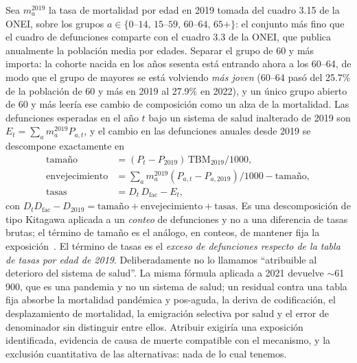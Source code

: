 \documentclass[11pt,a4paper]{article}
\begin{document}
Sea $m^{2019}_a$ la tasa de mortalidad por edad en 2019 tomada del cuadro 3.15 de la ONEI, sobre los grupos $a\in\{0\text{--}14,\,15\text{--}59,\,60\text{--}64,\,65+\}$: el conjunto más fino que el cuadro de defunciones comparte con el cuadro 3.3 de la ONEI, que publica anualmente la población media por edades.
Separar el grupo de 60 y más importa: la cohorte nacida en los años sesenta está entrando ahora a los 60--64, de modo que el grupo de mayores se está volviendo \emph{más joven} (60--64 pasó del 25.7\% de la población de 60 y más en 2019 al 27.9\% en 2022), y un único grupo abierto de 60 y más leería ese cambio de composición como un alza de la mortalidad.
Las defunciones esperadas en el año $t$ bajo un sistema de salud inalterado de 2019 son $E_t=\sum_a m^{2019}_a P_{a,t}$, y el cambio en las defunciones anuales desde 2019 se descompone exactamente en
\begin{align}
\text{tamaño} &= (P_t-P_{2019})\,\mathrm{TBM}_{2019}/1000, \\
\text{envejecimiento} &= \textstyle\sum_a m^{2019}_a (P_{a,t}-P_{a,2019})/1000 - \text{tamaño}, \\
\text{tasas} &= D_t\,D_{\mathrm{fac}} - E_t,
\end{align}
con $D_t D_{\mathrm{fac}} - D_{2019} = \text{tamaño}+\text{envejecimiento}+\text{tasas}$.
Es una descomposición de tipo Kitagawa aplicada a un \emph{conteo} de defunciones y no a una diferencia de tasas brutas; el término de tamaño es el análogo, en conteos, de mantener fija la exposición~\citep{kitagawa1955}.
El término de tasas es el \emph{exceso de defunciones respecto de la tabla de tasas por edad de 2019}.
Deliberadamente no lo llamamos ``atribuible al deterioro del sistema de salud''.
La misma fórmula aplicada a 2021 devuelve $\sim$61\,900, que es una pandemia y no un sistema de salud; un residual contra una tabla fija absorbe la mortalidad pandémica y pos-aguda, la deriva de codificación, el desplazamiento de mortalidad, la emigración selectiva por salud y el error de denominador sin distinguir entre ellos.
Atribuir exigiría una exposición identificada, evidencia de causa de muerte compatible con el mecanismo, y la exclusión cuantitativa de las alternativas: nada de lo cual tenemos.
\end{document}

